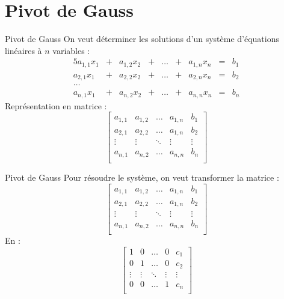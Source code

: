 \documentclass{main}
\begin{document}
\section{Pivot de Gauss}
\maketoc

\begin{frame}{Pivot de Gauss}
\vspace{-15pt}
On veut déterminer les solutions d'un système d'équations linéaires à $n$ variables :
\vspace{-15pt}
    \begin{alignat}{5}
  a_{1,1}x_1 &{}+{}& a_{1,2}x_2 &{}+{}& \dots & {}+{} &  a_{1,n}x_n &{}={}& b_1   \\
  a_{2,1}x_1 &{}+{}& a_{2,2}x_2 &{}+{}& \dots & {}+{} &  a_{2,n}x_n &{}={}& b_2   \\
  \dots \\ 
  a_{n,1}x_1 &{}+{}& a_{n,2}x_2 &{}+{}& \dots & {}+{} &  a_{n,n}x_n &{}={}& b_n   
\end{alignat}
Représentation en matrice :
$$\left[\begin{array}{rrrr|r}
  a_{1,1} &  a_{1,2} & \dots &   a_{1,n} & b_1 \\
  a_{2,1} &  a_{2,2} & \dots &   a_{1,n} & b_2 \\
  \vdots &  \vdots & \ddots &   \vdots  & \vdots \\
  a_{n,1} &  a_{n,2} & \dots &   a_{n,n} & b_n \\
\end{array}\right]$$
\end{frame}


\begin{frame}{Pivot de Gauss}
Pour résoudre le système, on veut transformer la matrice :
$$\left[\begin{array}{rrrr|r}
  a_{1,1} &  a_{1,2} & \dots &   a_{1,n} & b_1 \\
  a_{2,1} &  a_{2,2} & \dots &   a_{1,n} & b_2 \\
  \vdots &  \vdots & \ddots &   \vdots  & \vdots \\
  a_{n,1} &  a_{n,2} & \dots &   a_{n,n} & b_n \\
\end{array}\right]$$
En : 
$$\left[\begin{array}{rrrr|r}
  1 &  0 & \dots &   0 & c_1 \\
  0 &  1 & \dots &   0 & c_2 \\
  \vdots &  \vdots & \ddots &   \vdots  & \vdots \\
  0 &  0 & \dots &   1 & c_n \\ 
\end{array}\right]$$
\end{frame}
\end{document}
